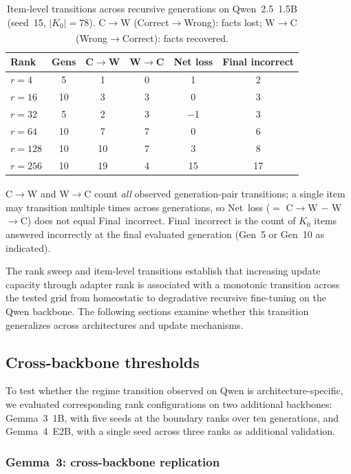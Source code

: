 \documentclass[a4paper,fleqn]{cas-dc}
\newif\ifshowchanges
\newcommand{\rev}[1]{\ifshowchanges{\color{blue}#1}\else{#1}\fi}
\newcommand{\Kcard}{\lvert K_0\rvert}
\renewcommand{\arraystretch}{1.8}
\begin{document}
\begin{table}[pos=htbp]
\caption{Item-level transitions across recursive generations on
Qwen~2.5~1.5B (seed~15, $\rev{\Kcard = 78}$). C$\to$W (Correct$\to$Wrong): facts lost;
W$\to$C (Wrong$\to$Correct): facts recovered.\textsuperscript{\dag}}\label{tab:transitions}
\footnotesize
\renewcommand{\arraystretch}{1.4}
\begin{tabular}{@{}lccccc@{}}
\toprule
Rank & Gens & C$\to$W & W$\to$C & Net loss & Final incorrect \\
\midrule
$r=4$   & 5  & 1  & 0 & 1  & 2  \\
$r=16$  & 10 & 3  & 3 & 0  & 3  \\
$r=32$  & 5  & 2  & 3 & $-$1 & 3  \\
$r=64$  & 10 & 7  & 7 & 0  & 6  \\
$r=128$ & 10 & 10 & 7 & 3  & 8  \\
$r=256$ & 10 & 19 & 4 & 15 & 17 \\
\bottomrule
\end{tabular}
{\footnotesize\textsuperscript{\dag}C$\to$W and W$\to$C count \emph{all} observed generation-pair
transitions; a single item may transition multiple times across generations, so
Net~loss ($=$ C$\to$W $-$ W$\to$C) does not equal Final~incorrect.
Final~incorrect is the count of $K_0$ items answered incorrectly at the
final evaluated generation (Gen~5 or Gen~10 as indicated).}
\end{table}

The rank sweep and item-level transitions establish that increasing update
capacity through adapter rank \rev{is associated with a monotonic transition across the tested grid}
from homeostatic to degradative recursive fine-tuning on the Qwen backbone. The
following sections examine whether this transition generalizes across
architectures and update mechanisms.

\subsection{Cross-backbone thresholds}\label{sec:res_backbone}

To test whether the regime transition observed on Qwen is architecture-specific,
we evaluated corresponding rank configurations on two additional backbones:
Gemma~3~1B, with five seeds at the boundary ranks over ten generations, and
Gemma~4~E2B, with a single seed across three ranks as additional validation.

\subsubsection{Gemma~3: cross-backbone replication}
\end{document}
